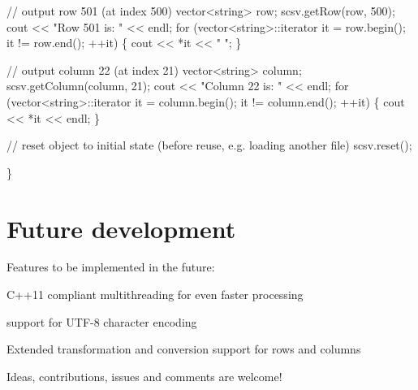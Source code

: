 \begin{DoxyCode}
    \textcolor{comment}{// output row 501 (at index 500)}
    vector<string> row;
    scsv.getRow(row, 500);
    cout << \textcolor{stringliteral}{"Row 501 is: "} << endl;
    \textcolor{keywordflow}{for} (vector<string>::iterator it = row.begin(); it != row.end(); ++it) \{
        cout << *it << \textcolor{stringliteral}{" "};
    \}

    \textcolor{comment}{// output column 22 (at index 21)}
    vector<string> column;
    scsv.getColumn(column, 21);
    cout << \textcolor{stringliteral}{"Column 22 is: "} << endl;
    \textcolor{keywordflow}{for} (vector<string>::iterator it = column.begin(); it != column.end(); ++it) \{
        cout << *it << endl;
    \}

    \textcolor{comment}{// reset object to initial state (before reuse, e.g. loading another file)}
    scsv.reset();

\}
\end{DoxyCode}


\section*{Future development}

Features to be implemented in the future\+:


\begin{DoxyItemize}
\item C++11 compliant multithreading for even faster processing
\item support for U\+T\+F-\/8 character encoding
\item Extended transformation and conversion support for rows and columns
\end{DoxyItemize}

Ideas, contributions, issues and comments are welcome! 
